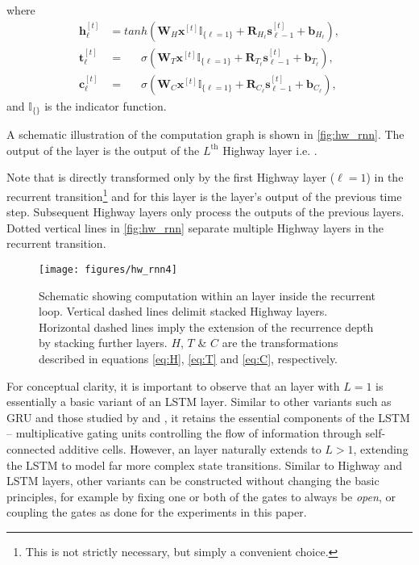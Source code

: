 \documentclass[letterpaper]{article}
\newcommand{\ts}[1]{^{[#1]}}
\def\Rmat{\mathbf{R}}
\def\Wmat{\mathbf{W}}
\def\xvec{\mathbf{x}}
\def\yvec{\mathbf{y}}
\def\Svec{\mathbf{s}}
\def\Hvec{\mathbf{h}}
\def\Tvec{\mathbf{t}}
\def\Cvec{\mathbf{c}}
\begin{document}
where
\begin{align}
\label{eq:H}
\Hvec\ts{t}_\ell &= tanh (\Wmat_H \xvec\ts{t} \mathbb{I}_{\{\ell=1\}} + \Rmat_{H_\ell} \Svec_{\ell-1}\ts{t} + \mathbf{b}_{H_\ell}),\\
\label{eq:T}
\Tvec\ts{t}_\ell &= \,\,\,\quad\sigma(\Wmat_T \xvec\ts{t} \mathbb{I}_{\{\ell=1\}} + \Rmat_{T_\ell} \Svec_{\ell-1}\ts{t} + \mathbf{b}_{T_\ell}),\\
\label{eq:C}
\Cvec\ts{t}_\ell &= \,\,\,\quad\sigma(\Wmat_C \xvec\ts{t} \mathbb{I}_{\{\ell=1\}} + \Rmat_{C_\ell} \Svec_{\ell-1}\ts{t}+ \mathbf{b}_{C_\ell}),
\end{align}
and $\mathbb{I}_{\{\}}$ is the indicator function.

A schematic illustration of the \arch{} computation graph is shown in \autoref{fig:hw_rnn}.
The output of the \arch{} layer is the output of the $L^\mathrm{th}$ Highway layer i.e. \smash{$\yvec\ts{t} = \Svec_L\ts{t}$}.

Note that \smash{$\xvec\ts{t}$} is directly transformed only by the first Highway layer ($\ell=1$) in the recurrent transition\footnote[1]{This is not strictly necessary, but simply a convenient choice.} and for this layer \smash{$\Svec_{\ell-1}\ts{t}$} is the \arch{} layer's output of the previous time step.
Subsequent Highway layers only process the outputs of the previous layers.
Dotted vertical lines in \autoref{fig:hw_rnn} separate multiple Highway layers in the recurrent transition. 
\begin{figure*}
\begin{center}
\texttt{[image: figures/hw\_rnn4]} \caption{Schematic showing computation within an \arch{} layer inside the recurrent loop. Vertical dashed lines delimit stacked Highway layers. Horizontal dashed lines imply the extension of the recurrence depth by stacking further layers. $H$, $T$ \& $C$ are the transformations described in equations \ref{eq:H}, \ref{eq:T} and \ref{eq:C}, respectively.}
\label{fig:hw_rnn}
\end{center}
\end{figure*}

For conceptual clarity, it is important to observe that an \arch{} layer with $L=1$ is essentially a basic variant of an LSTM layer.
Similar to other variants such as GRU \citep{cho2014} and those studied by \citet{greff2015lstm} and \citet{jozefowicz2015}, it retains the essential components of the LSTM -- multiplicative gating units controlling the flow of information through self-connected additive cells.
However, an \arch{} layer naturally extends to $L>1$, extending the LSTM to model far more complex state transitions.
Similar to Highway and LSTM layers, other variants can be constructed without changing the basic principles, for example by fixing one or both of the gates to always be \emph{open}, or coupling the gates as done for the experiments in this paper.
\end{document}
